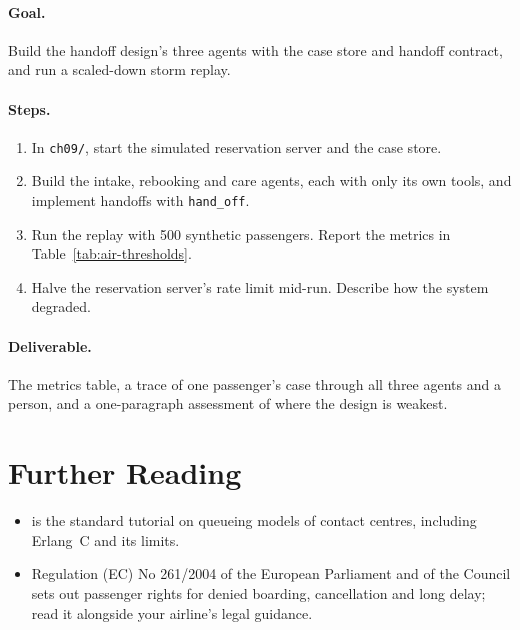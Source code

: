 \paragraph{Goal.} Build the handoff design's three agents with the case store and handoff contract, and run a scaled-down storm replay.

\paragraph{Steps.}
\begin{enumerate}[itemsep=2pt]
  \item In \texttt{ch09/}, start the simulated reservation server and the case store.
  \item Build the intake, rebooking and care agents, each with only its own tools, and implement handoffs with \texttt{hand\_off}.
  \item Run the replay with 500 synthetic passengers. Report the metrics in Table~\ref{tab:air-thresholds}.
  \item Halve the reservation server's rate limit mid-run. Describe how the system degraded.
\end{enumerate}

\paragraph{Deliverable.} The metrics table, a trace of one passenger's case through all three agents and a person, and a one-paragraph assessment of where the design is weakest.

\section*{Further Reading}

\begin{itemize}[itemsep=2pt]
  \item \citet{gans2003callcenters} is the standard tutorial on queueing models of contact centres, including Erlang~C and its limits.
  \item Regulation (EC) No 261/2004 of the European Parliament and of the Council sets out passenger rights for denied boarding, cancellation and long delay; read it alongside your airline's legal guidance.
\end{itemize}
